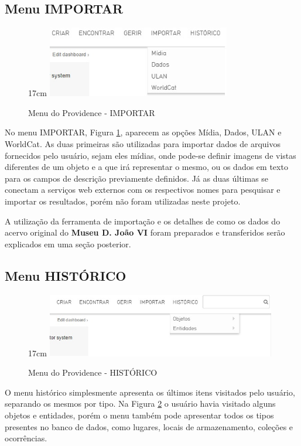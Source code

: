\documentclass[a4paper,12pt,oneside,onecolumn,final,fleqn]{repUERJ}
\begin{document}
\subsection{Menu IMPORTAR}

\begin{figure}[!ht]{17cm}
	\includegraphics[width=8cm, center]{figuras/menu_importar.jpg}
	\caption{Menu do Providence - IMPORTAR} \label{fig:menu_importar}
\end{figure}

No menu IMPORTAR, Figura \ref{fig:menu_importar}, aparecem as opções Mídia, Dados, ULAN e WorldCat. As duas primeiras são utilizadas para importar dados de arquivos fornecidos pelo usuário, sejam eles mídias, onde pode-se definir imagens de vistas diferentes de um objeto e a que irá representar o mesmo, ou os dados em texto para os campos de descrição previamente definidos. Já as duas últimas se conectam a serviços web externos com os respectivos nomes para pesquisar e importar os resultados, porém não foram utilizadas neste projeto.

A utilização da ferramenta de importação e os detalhes de como os dados do acervo original do \textbf{Museu D. João VI} foram preparados e transferidos serão explicados em uma seção posterior.

\subsection{Menu HISTÓRICO}

\begin{figure}[!ht]{17cm}
	\includegraphics[width=10cm, center]{figuras/menu_hist.jpg}
	\caption{Menu do Providence - HISTÓRICO} \label{fig:menu_hist}
\end{figure}

O menu histórico simplesmente apresenta os últimos itens visitados pelo usuário, separando os mesmos por tipo. Na Figura \ref{fig:menu_hist} o usuário havia visitado alguns objetos e entidades, porém o menu também pode apresentar todos os tipos presentes no banco de dados, como lugares, locais de armazenamento, coleções e ocorrências.
\end{document}

